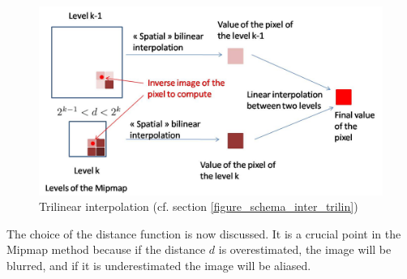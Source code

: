 




\label{figure_schema_inter_trilin}
\begin{figure}[h!]
\centering
\includegraphics[scale=0.5]{intertrilineaire.jpg}
\caption{Trilinear interpolation (cf. section \ref{figure_schema_inter_trilin})}
\label{intertrilineaire}
\end{figure}

\label{fonctiondistance}

The choice of the distance function is now discussed. It is a crucial point in the Mipmap method because if the distance $d$ is overestimated, the image will be blurred, and if it is underestimated the image will be aliased.

